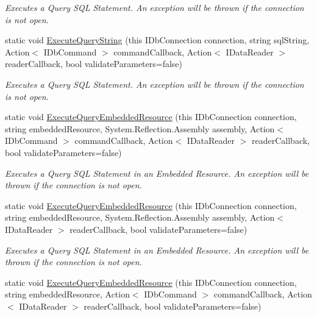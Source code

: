\begin{DoxyCompactItemize}
\begin{DoxyCompactList}\small\item\em Executes a Query S\+QL Statement. An exception will be thrown if the connection is not open. \end{DoxyCompactList}\item 
static void \mbox{\hyperlink{class_blue_cloud_1_1_extensions_1_1_data_1_1_i_db_connection_extensions_a323ca90a66dc4e4319b94718ee6cf35c}{Execute\+Query\+String}} (this I\+Db\+Connection connection, string sql\+String, Action$<$ I\+Db\+Command $>$ command\+Callback, Action$<$ I\+Data\+Reader $>$ reader\+Callback, bool validate\+Parameters=false)
\begin{DoxyCompactList}\small\item\em Executes a Query S\+QL Statement. An exception will be thrown if the connection is not open. \end{DoxyCompactList}\item 
static void \mbox{\hyperlink{class_blue_cloud_1_1_extensions_1_1_data_1_1_i_db_connection_extensions_a430c474cab2d89d20604579a66052020}{Execute\+Query\+Embedded\+Resource}} (this I\+Db\+Connection connection, string embedded\+Resource, System.\+Reflection.\+Assembly assembly, Action$<$ I\+Db\+Command $>$ command\+Callback, Action$<$ I\+Data\+Reader $>$ reader\+Callback, bool validate\+Parameters=false)
\begin{DoxyCompactList}\small\item\em Executes a Query S\+QL Statement in an Embedded Resource. An exception will be thrown if the connection is not open. \end{DoxyCompactList}\item 
static void \mbox{\hyperlink{class_blue_cloud_1_1_extensions_1_1_data_1_1_i_db_connection_extensions_a51679e971136235758d02f0bcdeb1822}{Execute\+Query\+Embedded\+Resource}} (this I\+Db\+Connection connection, string embedded\+Resource, System.\+Reflection.\+Assembly assembly, Action$<$ I\+Data\+Reader $>$ reader\+Callback, bool validate\+Parameters=false)
\begin{DoxyCompactList}\small\item\em Executes a Query S\+QL Statement in an Embedded Resource. An exception will be thrown if the connection is not open. \end{DoxyCompactList}\item 
static void \mbox{\hyperlink{class_blue_cloud_1_1_extensions_1_1_data_1_1_i_db_connection_extensions_a027aaac95ad6cea7e42317bd2b3ec9ac}{Execute\+Query\+Embedded\+Resource}} (this I\+Db\+Connection connection, string embedded\+Resource, Action$<$ I\+Db\+Command $>$ command\+Callback, Action$<$ I\+Data\+Reader $>$ reader\+Callback, bool validate\+Parameters=false)

\end{DoxyCompactItemize}
